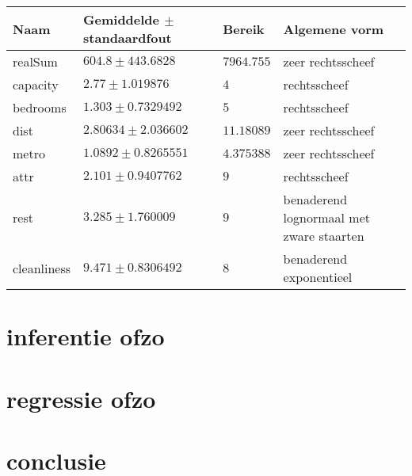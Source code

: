 \documentclass{article}
\begin{document}
	\begin{center}
		\begin{tabular}{| l| l| l|  p{5cm} |}
		\hline
		Naam & Gemiddelde $\pm$ standaardfout  & Bereik & Algemene vorm\\  [0.5ex]
		\hline\hline
		realSum & $604.8\pm 443.6828 $ & $7964.755$  &  zeer rechtsscheef\\   
		\hline
		capacity & $2.77\pm 1.019876$ & $4$  & rechtsscheef \\
		\hline
		bedrooms & $1.303\pm 0.7329492$ & $5$ & rechtsscheef \\
		\hline
		dist & $2.80634\pm 2.036602$  & $11.18089$ & zeer rechtsscheef \\ [1ex] 
		\hline
		metro & $1.0892\pm 0.8265551$ & $4.375388$ & zeer rechtsscheef \\ [1ex] 
		\hline
		attr & $2.101\pm 0.9407762$ & $9$  & rechtsscheef \\ [1ex] 
		\hline
		rest & $3.285\pm 1.760009$ & $9$ & benaderend lognormaal met zware staarten \\ [1ex] 
		\hline
		cleanliness & $9.471\pm 0.8306492$ & $8$ & benaderend exponentieel  \\ [1ex] 
		\hline
	\end{tabular}
\end{center}
	















\section{inferentie ofzo}
\section{regressie ofzo}
\section{conclusie}
\end{document}
